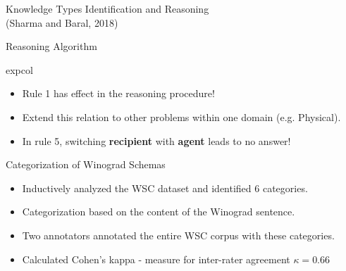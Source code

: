 \documentclass[svgnames, final, 20pt]{beamer} %
\begin{document}
\begin{frame}[fragile]
\begin{columns}[t]
\begin{block}{Knowledge Types Identification and Reasoning\\(Sharma and Baral, 2018)}
\begin{block}{Reasoning Algorithm}
\begin{beamercolorbox}[rounded=true,sep=0.3cm]{expcol}
\end{beamercolorbox}

\begin{itemize}
	\item Rule 1 {\color{myorange}has effect} in the reasoning procedure!
	\item Extend this relation to other problems within one domain (e.g. Physical).
	\item In rule 5, switching \textbf{recipient} with \textbf{agent} leads to no answer!
\end{itemize}

\end{block}
\vspace{-0.6cm}

\begin{block}{Categorization of Winograd Schemas}
\justify 
\begin{itemize}
	\item Inductively analyzed the WSC dataset and identified {\color{myorange}6 categories}.
	\item Categorization based on the {\color{myorange}content} of the Winograd sentence.
	\item Two annotators annotated the entire WSC corpus with these categories.
	\item Calculated Cohen's kappa - measure for inter-rater agreement $\kappa=0.66$
\end{itemize}
 
\vspace{1cm}
\end{block}
\end{block}
\end{columns}
\end{frame}
\end{document}
